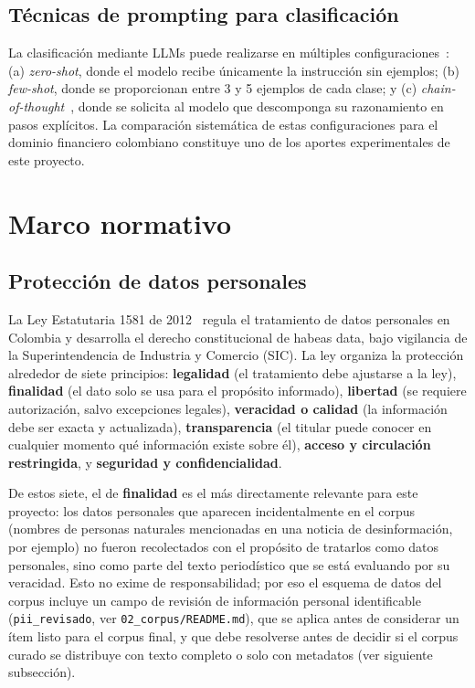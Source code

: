 \subsection{Técnicas de prompting para clasificación}

La clasificación mediante LLMs puede realizarse en múltiples configuraciones~\cite{Brown2020}: (a) \textit{zero-shot}, donde el modelo recibe únicamente la instrucción sin ejemplos; (b) \textit{few-shot}, donde se proporcionan entre 3 y 5 ejemplos de cada clase; y (c) \textit{chain-of-thought}~\cite{Wei2022}, donde se solicita al modelo que descomponga su razonamiento en pasos explícitos. La comparación sistemática de estas configuraciones para el dominio financiero colombiano constituye uno de los aportes experimentales de este proyecto.

\section{Marco normativo}

\subsection{Protección de datos personales}

La Ley Estatutaria 1581 de 2012~\cite{Ley15812012} regula el tratamiento de datos personales en Colombia y desarrolla el derecho constitucional de habeas data, bajo vigilancia de la Superintendencia de Industria y Comercio (SIC). La ley organiza la protección alrededor de siete principios: \textbf{legalidad} (el tratamiento debe ajustarse a la ley), \textbf{finalidad} (el dato solo se usa para el propósito informado), \textbf{libertad} (se requiere autorización, salvo excepciones legales), \textbf{veracidad o calidad} (la información debe ser exacta y actualizada), \textbf{transparencia} (el titular puede conocer en cualquier momento qué información existe sobre él), \textbf{acceso y circulación restringida}, y \textbf{seguridad y confidencialidad}.

De estos siete, el de \textbf{finalidad} es el más directamente relevante para este proyecto: los datos personales que aparecen incidentalmente en el corpus (nombres de personas naturales mencionadas en una noticia de desinformación, por ejemplo) no fueron recolectados con el propósito de tratarlos como datos personales, sino como parte del texto periodístico que se está evaluando por su veracidad. Esto no exime de responsabilidad; por eso el esquema de datos del corpus incluye un campo de revisión de información personal identificable (\texttt{pii\_revisado}, ver \texttt{02\_corpus/README.md}), que se aplica antes de considerar un ítem listo para el corpus final, y que debe resolverse antes de decidir si el corpus curado se distribuye con texto completo o solo con metadatos (ver siguiente subsección).

